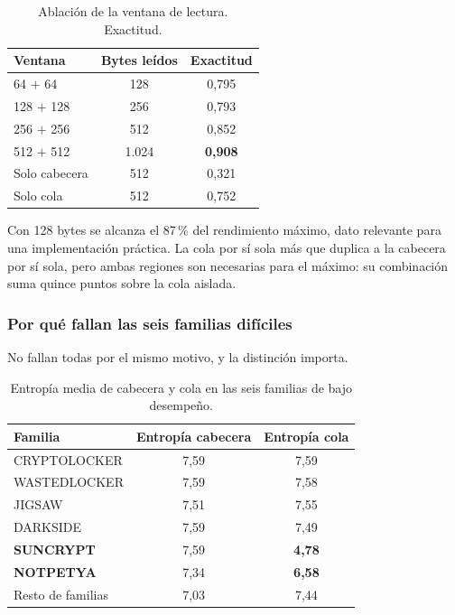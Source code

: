 \documentclass[11pt,a4paper]{article}
\begin{document}
\begin{table}[h]
\centering\small
\caption{Ablación de la ventana de lectura. Exactitud.}
\begin{tabular}{@{}lcc@{}}
\toprule
\textbf{Ventana} & \textbf{Bytes leídos} & \textbf{Exactitud} \\
\midrule
64 $+$ 64 & 128 & 0,795 \\
128 $+$ 128 & 256 & 0,793 \\
256 $+$ 256 & 512 & 0,852 \\
512 $+$ 512 & 1.024 & \textbf{0,908} \\
Solo cabecera & 512 & 0,321 \\
Solo cola & 512 & 0,752 \\
\bottomrule
\end{tabular}
\end{table}

Con 128 bytes se alcanza el 87\,\% del rendimiento máximo, dato relevante para una
implementación práctica. La cola por sí sola más que duplica a la cabecera por sí sola, pero
ambas regiones son necesarias para el máximo: su combinación suma quince puntos sobre la cola
aislada.

\subsubsection*{Por qué fallan las seis familias difíciles}

No fallan todas por el mismo motivo, y la distinción importa.

\begin{table}[h]
\centering\small
\caption{Entropía media de cabecera y cola en las seis familias de bajo desempeño.}
\begin{tabular}{@{}lcc@{}}
\toprule
\textbf{Familia} & \textbf{Entropía cabecera} & \textbf{Entropía cola} \\
\midrule
CRYPTOLOCKER & 7,59 & 7,59 \\
WASTEDLOCKER & 7,59 & 7,58 \\
JIGSAW & 7,51 & 7,55 \\
DARKSIDE & 7,59 & 7,49 \\
\textbf{SUNCRYPT} & 7,59 & \textbf{4,78} \\
\textbf{NOTPETYA} & 7,34 & \textbf{6,58} \\
\midrule
Resto de familias & 7,03 & 7,44 \\
\bottomrule
\end{tabular}
\end{table}
\end{document}
